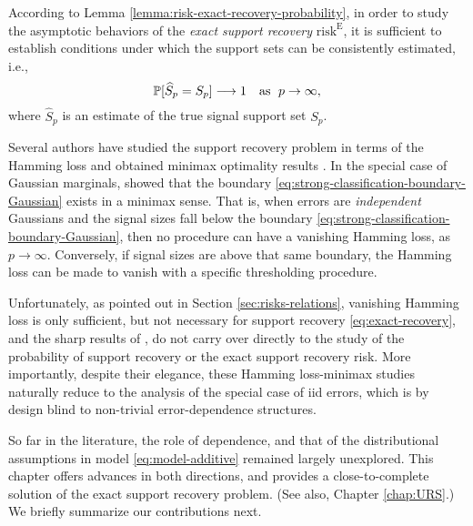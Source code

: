 According to Lemma \ref{lemma:risk-exact-recovery-probability}, in order to study the asymptotic behaviors of 
the {\em exact support recovery} $\mathrm{risk}^{\mathrm{E}}$, it is sufficient to establish conditions under which the support sets can be consistently estimated, i.e.,
\begin{equation} \label{eq:exact-recovery} 
    \P[\widehat{S}_p = S_p] \longrightarrow 1 \quad \text{as } \; p\to\infty, 
\end{equation}
where $\widehat{S}_p$ is an estimate of the true signal support set $S_p$.

\medskip

Several authors have studied the support recovery problem in terms of the Hamming loss and obtained minimax optimality results \citep[see, e.g.][]{ji2012ups, genovese2012comparison, jin2014optimality, butucea2018variable}.
In the special case of Gaussian marginals, \cite{butucea2018variable} showed that the boundary \eqref{eq:strong-classification-boundary-Gaussian} exists in a minimax sense.
That is, when errors are \emph{independent} Gaussians and the signal sizes fall below the boundary 
\eqref{eq:strong-classification-boundary-Gaussian}, then no procedure can have a vanishing Hamming
loss, as $p\to\infty$.  Conversely, if signal sizes are above that same boundary, the Hamming loss can be made to 
vanish with a specific thresholding procedure.

Unfortunately, as pointed out in Section \ref{sec:risks-relations}, vanishing Hamming loss is only sufficient, but
not necessary for support recovery \eqref{eq:exact-recovery}, and the sharp results of \cite{butucea2018variable}, 
do not carry over directly to the study of the probability of support recovery or the exact support recovery risk.
More importantly, despite their elegance, these Hamming loss-minimax studies naturally reduce to the analysis of the special case of iid errors, which is by design blind to non-trivial error-dependence structures.

So far in the literature, the role of dependence, and that of the distributional assumptions in model \eqref{eq:model-additive} remained largely unexplored.  
This chapter offers advances in both directions, and provides a close-to-complete solution of the exact support recovery problem. (See also, Chapter \ref{chap:URS}.)
We briefly summarize our contributions next.


